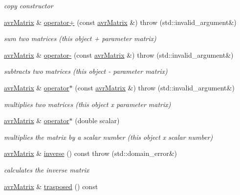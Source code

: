 \begin{DoxyCompactItemize}
\begin{DoxyCompactList}\small\item\em copy constructor \end{DoxyCompactList}\item 
\hyperlink{classavr_matrix}{avr\-Matrix} \& \hyperlink{classavr_matrix_ab0a3eb564d518e9bb19423e38225d5ab}{operator+} (const \hyperlink{classavr_matrix}{avr\-Matrix} \&)  throw (std\-::invalid\-\_\-argument\&)
\begin{DoxyCompactList}\small\item\em sum two matrices (this object + parameter matrix) \end{DoxyCompactList}\item 
\hyperlink{classavr_matrix}{avr\-Matrix} \& \hyperlink{classavr_matrix_a158008cbe2eca3d0b7eae73354b8e85a}{operator-\/} (const \hyperlink{classavr_matrix}{avr\-Matrix} \&)  throw (std\-::invalid\-\_\-argument\&)
\begin{DoxyCompactList}\small\item\em subtracts two matrices (this object -\/ parameter matrix) \end{DoxyCompactList}\item 
\hyperlink{classavr_matrix}{avr\-Matrix} \& \hyperlink{classavr_matrix_a005b285625ae8e9c677cde1c42309c71}{operator$\ast$} (const \hyperlink{classavr_matrix}{avr\-Matrix} \&)  throw (std\-::invalid\-\_\-argument\&)
\begin{DoxyCompactList}\small\item\em multiplies two matrices (this object x parameter matrix) \end{DoxyCompactList}\item 
\hyperlink{classavr_matrix}{avr\-Matrix} \& \hyperlink{classavr_matrix_a90beb569a126464ac64d17a3a86d2b32}{operator$\ast$} (double scalar)
\begin{DoxyCompactList}\small\item\em multiplies the matrix by a scalar number (this object x scalar number) \end{DoxyCompactList}\item 
\hyperlink{classavr_matrix}{avr\-Matrix} \& \hyperlink{classavr_matrix_a5513ce11445f37491ae0aff012959498}{inverse} () const   throw (std\-::domain\-\_\-error\&)
\begin{DoxyCompactList}\small\item\em calculates the inverse matrix \end{DoxyCompactList}\item 
\hyperlink{classavr_matrix}{avr\-Matrix} \& \hyperlink{classavr_matrix_ac7e10b075dfcc8a35ef001cb053580d0}{trasposed} () const 

\end{DoxyCompactItemize}
